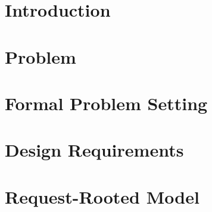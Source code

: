\documentclass[10pt,conference]{IEEEtran}
\begin{document}
\begin{abstract}
We implement the model in Boreal Network as a docs-first, machine-readable contract stack with JSON Schema, OpenAPI, event contracts, deterministic fixtures, and an evaluation harness for extraction, matching, planning, and mutation safety. We further define a lead-first orchestration policy that matches a primary \texttt{Supply} before decomposing work into \texttt{FulfillmentStep} sub-work, aiming to reduce over-decomposition, false completion, and premature execution. In a deterministic four-scenario benchmark spanning one digital and three embodied cases, the request-rooted baseline achieves 100\% contract pass, 100\% embodied-step recall, and 0\% false completion, while task-first and direct-tool baselines expose distinct failure modes: complete over-decomposition in the former and 100\% embodied-collapse plus 75\% false completion in the latter. A complementary live-model study across five OpenAI-routed models and two frozen prompt presets shows that current models can recover the correct lead and stay inside safe action bands while still failing exact canonical conformance and under-specifying verification fields. This paper contributes a durable object model for request-native work systems, a framing of generative plan collapse in embodied and digital fulfillment, and an artifact-backed methodology for evaluating continuity, traceability, human routing, and approval safety in external work orchestration.
\end{abstract}

\section{Introduction}


\section{Problem}


\section{Formal Problem Setting}


\section{Design Requirements}


\section{Request-Rooted Model}

\end{document}

